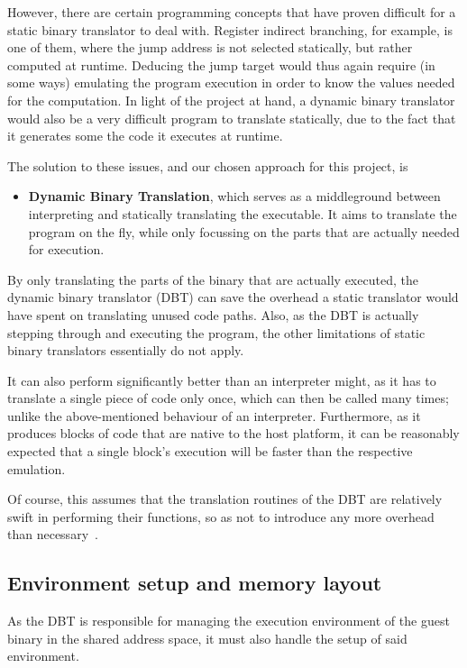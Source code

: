 However, there are certain programming concepts that have proven difficult for a static binary translator to deal with.
Register indirect branching, for example, is one of them, where the jump address is not selected statically, but rather computed at runtime.
Deducing the jump target would thus again require (in some ways) emulating the program execution in order to know the values needed for the computation.
In light of the project at hand, a dynamic binary translator would also be a very difficult program to translate statically, due to the fact that it generates some the code it executes at runtime.

The solution to these issues, and our chosen approach for this project, is
\begin{itemize}
	\item \textbf{Dynamic Binary Translation}, which serves as a middleground between interpreting and statically translating the executable.
	It aims to translate the program on the fly, while only focussing on the parts that are actually needed for execution.
\end{itemize}

By only translating the parts of the binary that are actually executed, the dynamic binary translator (DBT) can save the overhead a static translator would have spent on translating unused code paths.
Also, as the DBT is actually stepping through and executing the program, the other limitations of static binary translators essentially do not apply.

It can also perform significantly better than an interpreter might, as it has to translate a single piece of code only once, which can then be called many times; unlike the above-mentioned behaviour of an interpreter.
Furthermore, as it produces blocks of code that are native to the host platform, it can be reasonably expected that a single block's execution will be faster than the respective emulation.

Of course, this assumes that the translation routines of the DBT are relatively swift in performing their functions, so as not to introduce any more overhead than necessary~\cite[S. 1f.]{bintrans}.


\subsection{Environment setup and memory layout}
As the DBT is responsible for managing the execution environment of the guest binary in the shared address space, it must also handle the setup of said environment.

